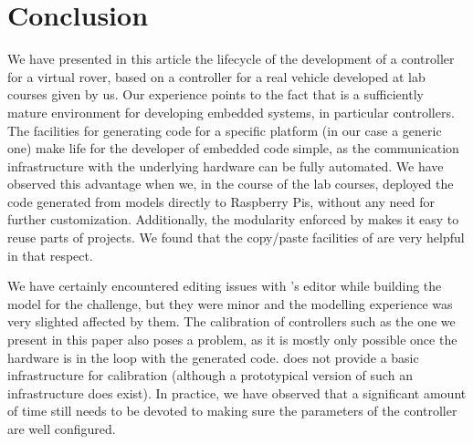 \section{Conclusion}
\label{sec:conclusion}

We have presented in this article the lifecycle of the development of
a controller for a virtual rover, based on a controller for a real vehicle
developed at lab courses given by us. Our experience points to the fact that \af is
a sufficiently mature environment for developing embedded systems, in
particular controllers. The facilities for generating code for a specific platform (in our case a generic one) make life
for the developer of embedded code simple, as the communication infrastructure
with the underlying hardware can be fully automated. We have observed this
advantage when we, in the course of the lab courses, deployed the code
generated from models directly to Raspberry Pis, without any need for further customization. Additionally, the modularity enforced by \af
makes it easy to reuse parts of projects. We found that the copy/paste
facilities of \af are very helpful in that respect.

We have certainly encountered editing issues with \af's editor while building
the model for the challenge, but they were minor and the modelling experience
was very slighted affected by them. The calibration of controllers such as the
one we present in this paper also poses a problem, as it is mostly only
possible once the hardware is in the loop with the generated code. \af does not
provide a basic infrastructure for calibration (although a prototypical version
of such an infrastructure does exist). In practice, we have observed that a
significant amount of time still needs to be devoted to making sure the
parameters of the controller are well configured.
